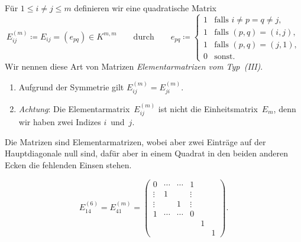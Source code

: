 \documentclass[a4paper]{article}
\begin{document}
\begin{definition}
    Für $1 \leq i \neq j \leq m$ definieren wir eine quadratische Matrix
    \begin{equation*}
        E_{ij}^{(m)} \coloneqq E_{ij} = (e_{pq}) \in K^{m,m} \qquad\text{durch}\qquad e_{pq} \coloneqq \begin{cases}
            1 & \text{falls } i \neq p = q \neq j, \\
            1 & \text{falls } (p,q) = (i,j),       \\
            1 & \text{falls } (p,q) = (j,1),       \\
            0 & \text{sonst}.
        \end{cases}
    \end{equation*}
    Wir nennen diese Art von Matrizen \emph{Elementarmatrizen vom Typ~(III)}.
\end{definition}

\begin{remark}\leavevmode
    \begin{enumerate}
        \item Aufgrund der Symmetrie gilt $E_{ij}^{(m)} = E_{ji}^{(m)}$.
        \item \emph{Achtung}: Die Elementarmatrix~$E_{ij}^{(m)}$ ist nicht die Einheitsmatrix~$E_m$, denn wir haben zwei Indizes $i$~und~$j$.
    \end{enumerate}
\end{remark}

Die Matrizen sind Elementarmatrizen, wobei aber zwei Einträge auf der Hauptdiagonale null sind, dafür aber in einem Quadrat in den beiden anderen Ecken die fehlenden Einsen stehen.

\begin{example}
    \begin{equation*}
        E_{14}^{(6)} = E_{41}^{(m)} = \begin{pmatrix}
            0      & \cdots & \cdots & 1      &   &   \\
            \vdots & 1      &        & \vdots &   &   \\
            \vdots &        & 1      & \vdots &   &   \\
            1      & \cdots & \cdots & 0      &   &   \\
                   &        &        &        & 1 &   \\
                   &        &        &        &   & 1
        \end{pmatrix}.
    \end{equation*}
\end{example}
\end{document}
